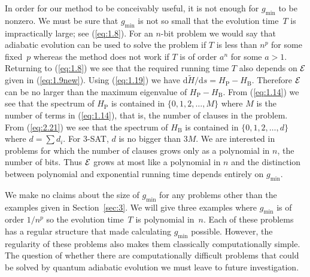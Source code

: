 \documentclass[twoside]{article}
\newcommand{\refEq}[1]{(\ref{eq:#1})}
\newcommand{\rd}{\mathrm{d}}
\newcommand{\rP}{{\mathrm{P}}}
\newcommand{\rB}{{\mathrm{B}}}
\newcommand{\gm}{g_{\min}}
\let\tilde\widetilde
\numberwithin{equation}{section}
\begin{document}
In order for our method to be conceivably useful, it is not enough for 
$\gm$  to be nonzero. We must be sure that
$\gm$ is not so small that the evolution time~$T$ is impractically large; see
\refEq{1.8}. For an $n$-bit problem we would say that adiabatic evolution
can be used to solve the problem if $T$ is less than $n^p$ for some
fixed~$p$ whereas the method does not work if $T$ is of order $a^n$ for
some $a>1$.  Returning to \refEq{1.8} we see that the required running
time $T$ also depends on ${\cal E}$ given in \refEq{1.9new}.  Using
\refEq{1.19} we have ${\rd\tilde H }/{\rd s} =H_\rP-H_\rB$.  Therefore
${\cal E}$ can be no larger than the maximum eigenvalue of
$H_\rP-H_\rB$.  From \refEq{1.14} we see that the spectrum of $H_\rP$ is
contained in 
$\{0,1,2,\dots,M\}$ where $M$ is the number of terms in \refEq{1.14}, 
that is, the number of clauses in the problem.  From \refEq{2.21} we see
that the spectrum of $H_\rB$  is contained in 
$\{0,1,2,\dots,d\}$ where $d=\sum d_i$. For 3-SAT, $d$ is no bigger than
$3M$.  We are interested in problems for which the number of clauses
grows only as a polynomial in $n$, the number of bits.  Thus
${\cal E}$ grows at most like a polynomial in $n$ and the distinction
between polynomial and exponential running time depends entirely on
$\gm$.

We make no claims about the size of $\gm$ for any problems other than
the examples given in Section~\ref{sec:3}. We will give three examples
where $\gm$ is  of order $1/n^p$ so the evolution time~$T$ is polynomial
in~$n$.  Each of these problems has a regular structure that made
calculating
$\gm$ possible. However, the regularity of these problems also makes
them classically computationally simple. The question of whether there are
computationally difficult problems that could be solved by quantum
adiabatic evolution we must leave to future investigation. 
\end{document}
